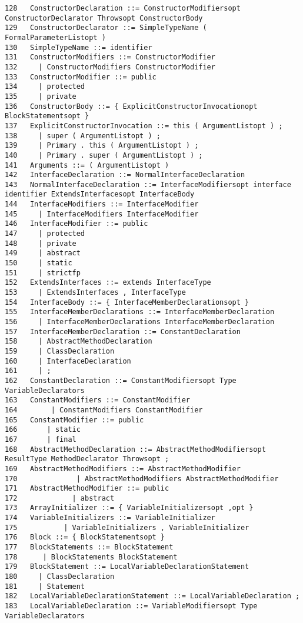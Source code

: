 {\begin{verbatim}
128   ConstructorDeclaration ::= ConstructorModifiersopt ConstructorDeclarator Throwsopt ConstructorBody
129   ConstructorDeclarator ::= SimpleTypeName ( FormalParameterListopt )
130   SimpleTypeName ::= identifier
131   ConstructorModifiers ::= ConstructorModifier
132     | ConstructorModifiers ConstructorModifier
133   ConstructorModifier ::= public
134     | protected
135     | private
136   ConstructorBody ::= { ExplicitConstructorInvocationopt BlockStatementsopt }
137   ExplicitConstructorInvocation ::= this ( ArgumentListopt ) ;
138     | super ( ArgumentListopt ) ;
139     | Primary . this ( ArgumentListopt ) ;
140     | Primary . super ( ArgumentListopt ) ;
141   Arguments ::= ( ArgumentListopt )
142   InterfaceDeclaration ::= NormalInterfaceDeclaration
143   NormalInterfaceDeclaration ::= InterfaceModifiersopt interface identifier ExtendsInterfacesopt InterfaceBody
144   InterfaceModifiers ::= InterfaceModifier
145     | InterfaceModifiers InterfaceModifier
146   InterfaceModifier ::= public
147     | protected
148     | private
149     | abstract
150     | static
151     | strictfp
152   ExtendsInterfaces ::= extends InterfaceType
153     | ExtendsInterfaces , InterfaceType
154   InterfaceBody ::= { InterfaceMemberDeclarationsopt }
155   InterfaceMemberDeclarations ::= InterfaceMemberDeclaration
156     | InterfaceMemberDeclarations InterfaceMemberDeclaration
157   InterfaceMemberDeclaration ::= ConstantDeclaration
158     | AbstractMethodDeclaration
159     | ClassDeclaration
160     | InterfaceDeclaration
161     | ;
162   ConstantDeclaration ::= ConstantModifiersopt Type VariableDeclarators
163   ConstantModifiers ::= ConstantModifier
164        | ConstantModifiers ConstantModifier
165   ConstantModifier ::= public
166       | static
167       | final
168   AbstractMethodDeclaration ::= AbstractMethodModifiersopt ResultType MethodDeclarator Throwsopt ;
169   AbstractMethodModifiers ::= AbstractMethodModifier
170              | AbstractMethodModifiers AbstractMethodModifier
171   AbstractMethodModifier ::= public
172             | abstract
173   ArrayInitializer ::= { VariableInitializersopt ,opt }
174   VariableInitializers ::= VariableInitializer
175           | VariableInitializers , VariableInitializer
176   Block ::= { BlockStatementsopt }
177   BlockStatements ::= BlockStatement
178      | BlockStatements BlockStatement
179   BlockStatement ::= LocalVariableDeclarationStatement
180     | ClassDeclaration
181     | Statement
182   LocalVariableDeclarationStatement ::= LocalVariableDeclaration ;
183   LocalVariableDeclaration ::= VariableModifiersopt Type VariableDeclarators

\end{verbatim}}
